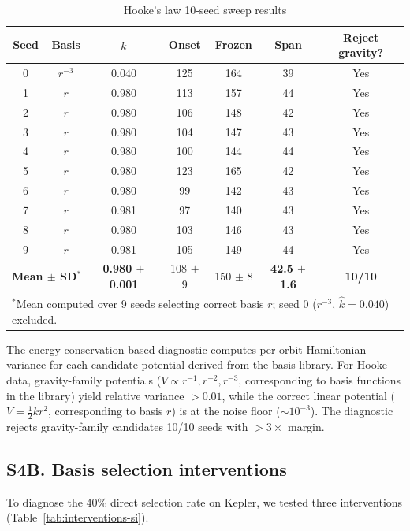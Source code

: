 \documentclass[aps,pre,reprint,superscriptaddress]{revtex4-2}
\begin{document}
\begin{table}[!ht]
\centering
\caption{Hooke's law 10-seed sweep results}
\label{tab:hooke-si}
\small
\begin{tabular}{ccccccc}
\hline
Seed & Basis & $\hat{k}$ & Onset & Frozen & Span & Reject gravity? \\
\hline
0 & $r^{-3}$ & 0.040 & 125 & 164 & 39 & Yes \\
1 & $r$ & 0.980 & 113 & 157 & 44 & Yes \\
2 & $r$ & 0.980 & 106 & 148 & 42 & Yes \\
3 & $r$ & 0.980 & 104 & 147 & 43 & Yes \\
4 & $r$ & 0.980 & 100 & 144 & 44 & Yes \\
5 & $r$ & 0.980 & 123 & 165 & 42 & Yes \\
6 & $r$ & 0.980 & 99 & 142 & 43 & Yes \\
7 & $r$ & 0.981 & 97 & 140 & 43 & Yes \\
8 & $r$ & 0.980 & 103 & 146 & 43 & Yes \\
9 & $r$ & 0.981 & 105 & 149 & 44 & Yes \\
\hline
\multicolumn{2}{l}{\textbf{Mean $\pm$ SD$^*$}} & \textbf{0.980 $\pm$ 0.001} & 108 $\pm$ 9 & 150 $\pm$ 8 & \textbf{42.5 $\pm$ 1.6} & \textbf{10/10} \\
\multicolumn{7}{l}{\footnotesize $^*$Mean computed over 9 seeds selecting correct basis $r$; seed 0 ($r^{-3}$, $\hat{k}=0.040$) excluded.} \\
\hline
\end{tabular}
\end{table}

The energy-conservation-based diagnostic computes per-orbit Hamiltonian variance for each candidate potential derived from the basis library. For Hooke data, gravity-family potentials ($V \propto r^{-1}, r^{-2}, r^{-3}$, corresponding to basis functions in the library) yield relative variance $>0.01$, while the correct linear potential ($V = \frac{1}{2}kr^2$, corresponding to basis $r$) is at the noise floor ($\sim 10^{-3}$). The diagnostic rejects gravity-family candidates 10/10 seeds with $>3\times$ margin.

\subsection{S4B. Basis selection interventions}
To diagnose the 40\% direct selection rate on Kepler, we tested three interventions (Table~\ref{tab:interventions-si}).
\end{document}
